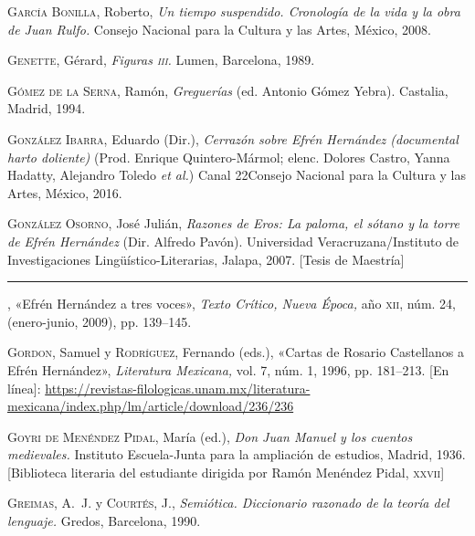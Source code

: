 \documentclass[14pt,twoside,final]{extbook} %
\begin{document}
\textsc{García Bonilla}, Roberto, \emph{Un tiempo suspendido. Cronología de la vida y la obra de Juan Rulfo.} Consejo Nacional para la Cultura y las Artes, México, 2008.\label{bib:garcia2008}

\textsc{Genette}, Gérard, \emph{Figuras \textsc{iii}.} Lumen, Barcelona, 1989.\label{bib:genette1989}

\textsc{Gómez de la Serna}, Ramón, \emph{Greguerías} (ed. Antonio Gómez Yebra). Castalia, Madrid, 1994.\label{bib:gomez1994}

\textsc{González Ibarra}, Eduardo (Dir.), \emph{Cerrazón sobre Efrén Hernández (documental harto doliente)} (Prod. Enrique Quintero-Mármol; elenc. Dolores Castro, Yanna Hadatty, Alejandro Toledo \emph{et al.}) Canal 22 Consejo Nacional para la Cultura y las Artes, México, 2016.\label{bib:gonzalez2016}

\textsc{González Osorno}, José Julián, \emph{Razones de Eros: \emph{La paloma, el sótano y la torre} de Efrén Hernández} (Dir. Alfredo Pavón). Universidad Veracruzana/Instituto de Investigaciones Lingüístico-Literarias, Jalapa, 2007. [Tesis de Maestría]\label{bib:gonzalez2007}

\rule{1cm}{0.4pt}, «Efrén Hernández a tres voces», \emph{Texto Crítico, Nueva Época,} año \textsc{xii}, núm. 24, (enero-junio, 2009), pp. 139--145.\label{bib:gonzalez2009}

\textsc{Gordon}, Samuel y \textsc{Rodríguez}, Fernando (eds.), «Cartas de Rosario Castellanos a Efrén Hernández», \emph{Literatura Mexicana,} vol. 7, núm. 1, 1996, pp. 181--213. [En línea]: \href{https://revistas-filologicas.unam.mx/literatura-mexicana/index.php/lm/article/download/236/236}{https://revistas-filologicas.unam.mx/literatura-mexicana/index.php/lm/article/download/236/236}\label{bib:gordon-rodriguez1996} 

\textsc{Goyri de Menéndez Pidal}, María (ed.), \emph{Don Juan Manuel y los cuentos medievales.} Instituto Escuela-Junta para la ampliación de estudios, Madrid, 1936. [Biblioteca literaria del estudiante dirigida por Ramón Menéndez Pidal, \textsc{xxvii}]\label{bib:goyri1936}

\textsc{Greimas}, A.~J. y \textsc{Courtés}, J., \emph{Semiótica. Diccionario razonado de la teoría del lenguaje.} Gredos, Barcelona, 1990.\label{bib:greimas1990}
\end{document}
